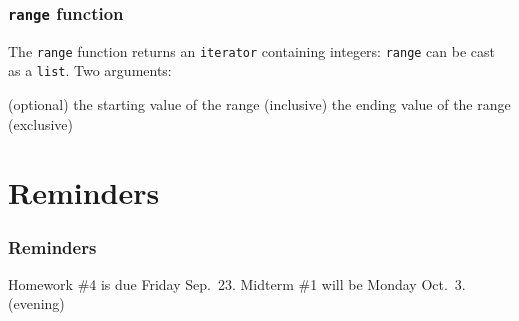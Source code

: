 \documentclass[11pt]{beamer}
\begin{document}
\begin{frame}[fragile]
  \frametitle{\texttt{range} function}
  \Enlarge

  \begin{itemize}
  \myitem  The \texttt{range} function returns an \texttt{iterator} containing integers:
  \myitem  \texttt{range} can be cast as a \texttt{list}.
  \myitem  Two arguments:
    \begin{itemize}
    \mysubitem  (optional) the starting value of the range (inclusive)
    \mysubitem  the ending value of the range (exclusive)
    \end{itemize}
  \end{itemize}
\end{frame}

\section{Reminders}

\begin{frame}
  \frametitle{Reminders}
  \Enlarge

  \begin{itemize}
  \myitem  Homework \#4 is due Friday Sep.\ 23.
  \myitem  Midterm \#1 will be Monday Oct.\ 3.  (evening)
  \end{itemize}
\end{frame}
\end{document}
